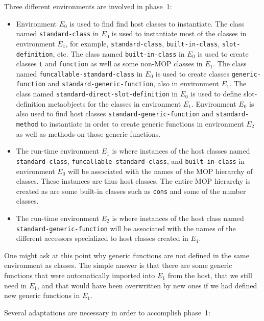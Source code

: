 Three different environments are involved in phase~1:

\begin{itemize}
\item Environment $E_0$ is used to find find host classes to
  instantiate.  The class named \texttt{standard-class} in $E_0$ is
  used to instantiate most of the classes in environment $E_1$, for
  example, \texttt{standard-class}, \texttt{built-in-class},
  \texttt{slot-definition}, etc.  The class named
  \texttt{built-in-class} in $E_0$ is used to create classes
  \texttt{t} and \texttt{function} as well as some non-MOP classes in
  $E_1$.  The class named \texttt{funcallable-standard-class} in $E_0$
  is used to create classes \texttt{generic-function} and
  \texttt{standard-generic-function}, also in environment $E_1$.  The
  class named \texttt{standard-direct-slot-definition} in $E_0$ is
  used to define slot-definition metaobjects for the classes in
  environment $E_1$.  Environment $E_0$ is also used to find host
  classes \texttt{standard-generic-function} and
  \texttt{standard-method} to instantiate in order to create generic
  functions in environment $E_2$ as well as methods on those generic
  functions.
\item The run-time environment $E_1$ is where instances of the host
  classes named \texttt{standard-class},
  \texttt{funcallable-standard-class}, and \texttt{built-in-class} in
  environment $E_0$ will be associated with the names of the MOP
  hierarchy of classes.  These instances are thus host classes.  The
  entire MOP hierarchy is created as are some built-in classes such as
  \texttt{cons} and some of the number classes.
\item The run-time environment $E_2$ is where instances of the host
  class named \texttt{standard-generic-function} will be associated
  with the names of the different accessors specialized to host
  classes created in $E_1$.
\end{itemize}

One might ask at this point why generic functions are not defined in
the same environment as classes.  The simple answer is that there are
some generic functions that were automatically imported into $E_1$
from the host, that we still need in $E_1$, and that would have been
overwritten by new ones if we had defined new generic functions in
$E_1$.

Several adaptations are necessary in order to accomplish phase~1:

